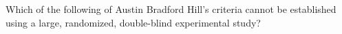 
Which of the following of Austin Bradford Hill's criteria cannot be established using a large,
randomized, double-blind experimental study?
\begin{MultipleChoice}
\end{MultipleChoice}